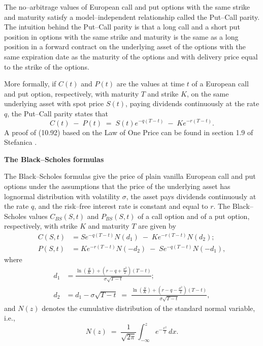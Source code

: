 
The no--arbitrage values of European call and put options with the same strike and
maturity satisfy a model--independent relationship called the Put--Call parity. The
intuition behind the Put--Call parity is that a long call and a short put position
in options with the same strike and maturity is the same as a long position in a
forward contract on the underlying asset of the options with the same expiration
date as the maturity of the options and with delivery price equal to the strike of
the options.

More formally, if $C(t)$ and $P(t)$ are the values at time $t$ of a European call
and put option, respectively, with maturity $T$ and strike $K$, on the same
underlying asset with spot price $S(t)$, paying dividends continuously at the rate
$q$, the Put--Call parity states that
\begin{equation}
C(t) \;-\; P(t) \;=\; S(t)e^{-q(T-t)} \;-\; Ke^{-r(T-t)}.
\end{equation}
A proof of (10.92) based on the Law of One Price can be found in section 1.9 of
Stefanica \cite{36}.

\medskip
\noindent\textbf{The Black--Scholes formulas}

The Black--Scholes formulas give the price of plain vanilla European call and put
options under the assumptions that the price of the underlying asset has lognormal
distribution with volatility $\sigma$, the asset pays dividends continuously at the
rate $q$, and the risk--free interest rate is constant and equal to $r$. The
Black--Scholes values $C_{BS}(S,t)$ and $P_{BS}(S,t)$ of a call option and of a put
option, respectively, with strike $K$ and maturity $T$ are given by
\begin{align}
C(S,t) &= Se^{-q(T-t)}N(d_1) \;-\; Ke^{-r(T-t)}N(d_2); \\
P(S,t) &= Ke^{-r(T-t)}N(-d_2) \;-\; Se^{-q(T-t)}N(-d_1),
\end{align}
where
\begin{align}
d_1 &= \frac{\ln\left(\frac{S}{K}\right) +
\left(r-q+\frac{\sigma^2}{2}\right)(T-t)}{\sigma\sqrt{T-t}}; \\
d_2 &= d_1 - \sigma\sqrt{T-t} \;=\; \frac{\ln\left(\frac{S}{K}\right) +
\left(r-q-\frac{\sigma^2}{2}\right)(T-t)}{\sigma\sqrt{T-t}},
\end{align}
and $N(z)$ denotes the cumulative distribution of the standard normal variable,
i.e.,
\[
N(z) \;=\; \frac{1}{\sqrt{2\pi}}\int_{-\infty}^z e^{-\frac{x^2}{2}}\,dx.
\]

